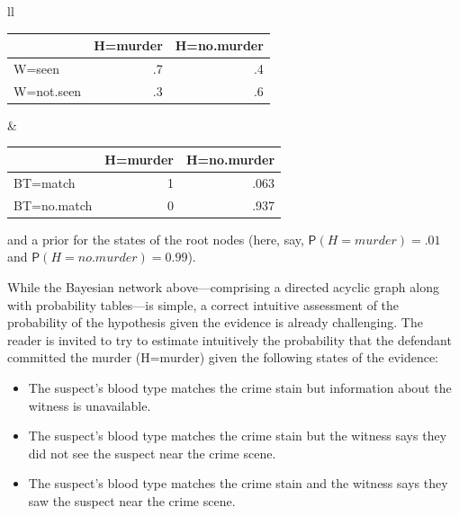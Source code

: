 \documentclass[11pt,dvipsnames,enabledeprecatedfontcommands]{scrartcl}
\newcommand{\pr}[1]{\mathsf{P}(#1)}
\begin{document}
\noindent

\begin{tabular}{ll}
\begin{minipage}[c]{0.45\linewidth}
\begin{table}[H]
\centering
\begin{tabular}{lrr}
\toprule
  & H=murder & H=no.murder\\
\midrule
W=seen & .7 & .4\\
W=not.seen & .3 & .6\\
\bottomrule
\end{tabular}
\end{table}
\end{minipage}& \begin{minipage}[c]{0.45\linewidth}
\begin{table}[H]
\centering
\begin{tabular}{lrr}
\toprule
  & H=murder & H=no.murder\\
\midrule
BT=match & 1 & .063\\
BT=no.match & 0 & .937\\
\bottomrule
\end{tabular}
\end{table}
\end{minipage}
\end{tabular}

\vspace{2mm}

\noindent and a prior for the states of the root nodes (here, say,
\(\pr{H=murder} = .01\) and \(\pr{H= no.murder} = 0.99\)).

While the Bayesian network above---comprising a directed acyclic graph
along with probability tables---is simple, a correct intuitive
assessment of the probability of the hypothesis given the evidence is
already challenging. The reader is invited to try to estimate
intuitively the probability that the defendant committed the murder
(H=murder) given the following states of the evidence:

\begin{itemize} 
\item The suspect's blood type matches the crime stain but  information about the witness is unavailable.
\item The suspect's blood type matches the crime stain but the witness says they did not see the suspect near the crime scene.
\item The suspect's blood type matches the crime stain and the witness says they saw the suspect near the crime scene.
\end{itemize}
\end{document}
